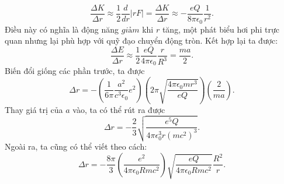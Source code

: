 \begin{loigiai}
\begin{enumerate}[1)]
\begin{enumerate}[a)]
 $$
\dfrac{\Delta K}{\Delta r} \approx \frac{1}{2} \dfrac{d}{d r}|r F|=\dfrac{\Delta K}{\Delta r} \approx-\dfrac{e Q}{8 \pi \epsilon_{0}} \dfrac{1}{r^{2}}.
$$
Điều này có nghĩa là động năng $\textit{giảm}$ khi $r$ tăng, một phát biểu hơi phi trực quan nhưng lại phù hợp với quỹ đạo chuyển động tròn. Kết hợp lại ta được:
$$
\dfrac{\Delta E}{\Delta r} \approx \dfrac{1}{2} \dfrac{e Q}{4 \pi \epsilon_{0}} \dfrac{r}{R^{3}}=\dfrac{m a}{2} .
$$
Biến đổi giống các phần trước, ta được
$$
\Delta r=-\left(\dfrac{1}{6 \pi} \dfrac{a^{2}}{c^{3} \epsilon_{0}} e^{2}\right)\left(2 \pi \sqrt{\dfrac{4 \pi \epsilon_{0} m r^{3}}{e Q}}\right)\left(\dfrac{2}{m a}\right).
$$
Thay giá trị của $a$ vào, ta có thể rút ra được
$$
\Delta r=-\dfrac{2}{3} \sqrt{\dfrac{e^{5} Q}{4 \pi \epsilon_{0}^{3} r\left(m c^{2}\right)^{3}}}.
$$
Ngoài ra, ta cũng có thể viết theo cách:
$$
\Delta r=-\dfrac{8 \pi}{3}\left(\dfrac{e^{2}}{4 \pi \epsilon_{0} R m c^{2}}\right) \sqrt{\dfrac{e Q}{4 \pi \epsilon_{0} R m c^{2}}} \dfrac{R^{2}}{r}.
$$
\end{enumerate}
    \end{enumerate}
\end{loigiai}

